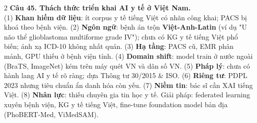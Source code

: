 \begin{paracol}{2}
\textbf{Câu 45. Thách thức triển khai AI y tế ở Việt Nam.}\\
(1) \textbf{Khan hiếm dữ liệu}: ít corpus y tế tiếng Việt có nhãn công khai; PACS bị khoá theo bệnh viện. (2) \textbf{Ngôn ngữ}: bệnh án trộn \textbf{Việt-Anh-Latin} (ví dụ "U não thể glioblastoma multiforme grade IV"); chưa có KG y tế tiếng Việt phổ biến; ánh xạ ICD-10 không nhất quán. (3) \textbf{Hạ tầng}: PACS cũ, EMR phân mảnh, GPU thiếu ở bệnh viện tỉnh. (4) \textbf{Domain shift}: model train ở nước ngoài (BraTS, ImageNet) kém trên máy quét VN và dân số VN. (5) \textbf{Pháp lý}: chưa có hành lang AI y tế rõ ràng; dựa Thông tư 30/2015 \& ISO. (6) \textbf{Riêng tư}: PDPL 2023 nhưng tiêu chuẩn ẩn danh hóa còn yếu. (7) \textbf{Niềm tin}: bác sĩ cần XAI tiếng Việt. (8) \textbf{Nhân lực}: thiếu chuyên gia tin học y tế. Giải pháp: federated learning xuyên bệnh viện, KG y tế tiếng Việt, fine-tune foundation model bản địa (PhoBERT-Med, ViMedSAM).

\switchcolumn*

\end{paracol}
